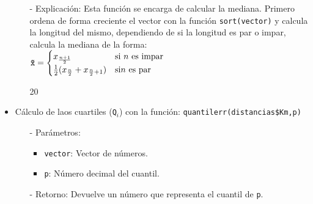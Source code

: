 \documentclass[a4paper, 12pt]{article}
\begin{document}
\begin{itemize}
\begin{itemize}
			\item[-] Explicación: Esta función se encarga de calcular la mediana. Primero ordena de forma creciente el vector con la función \texttt{sort(vector)} y calcula la longitud del mismo, dependiendo de si la longitud es par o impar, calcula la mediana de la forma: \\
			$\text{\texttt{\~{x}}} = \begin{cases} 
				x_{\frac{n+1}{2}} & \text{si } n \text{ es impar} \\
				\frac{1}{2}(x_{\frac{n}{2}} + x_{\frac{n}{2}+1}) & \text{si} n \text{ es par}
			\end{cases}$
\begin{Schunk}
\begin{Soutput}
[1] 20
\end{Soutput}
\end{Schunk}
		\end{itemize}
		
		\item Cálculo de laos cuartiles (\texttt{Q$_{i}$}) con la función: \texttt{quantilerr(distancias\$Km,p)}
		\begin{itemize}
			\item[-] Parámetros: 
			\begin{itemize}
				\item \texttt{vector}: Vector de números.
				\item \texttt{p}: Número decimal del cuantil.
			\end{itemize}
			
			\item[-] Retorno: Devuelve un número que representa el cuantil de \texttt{p}. 
			

\end{itemize}
\end{itemize}
\end{document}
